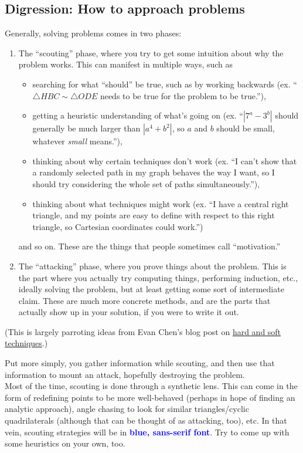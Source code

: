 \documentclass{scrartcl}
\providecommand{\ii}{\item}
\providecommand{\alert}[1]{{\sffamily\textbf{\textcolor{blue}{#1}}}}
\begin{document}
\subsection{Digression: How to approach problems}
Generally, solving problems comes in two phases:
\begin{enumerate}
	\ii The ``scouting'' phase, where you try to get some intuition
	about why the problem works.
	This can manifest in multiple ways, such as
	\begin{itemize}
		\ii searching for what ``should'' be true, such as by working backwards
		(ex. ``$\triangle HBC\sim\triangle ODE$ needs to be true
		for the problem to be true.''),
		\ii getting a heuristic understanding of what's going on
		(ex. ``$|7^a - 3^b|$ should generally be much larger than $|a^4 + b^2|$,
		so $a$ and $b$ should be small, whatever \emph{small} means.''),
		\ii thinking about why certain techniques don't work
		(ex. ``I can't show that a randomly selected path in my graph
		behaves the way I want, so I should try considering
		the whole set of paths simultaneously.''),
		\ii thinking about what techniques might work
		(ex. ``I have a central right triangle, and my points are easy to define
		with respect to this right triangle, so Cartesian coordinates could work.'')
	\end{itemize}
	and so on. These are the things that people sometimes call
	``motivation.''
	\ii The ``attacking'' phase, where you prove things about the problem.
	This is the part where you actually try computing things, performing induction,
	etc., ideally solving the problem, but at least getting some sort of
	intermediate claim. These are much more concrete methods,
	and are the parts that actually show up in your solution,
	if you were to write it out.
\end{enumerate}
(This is largely parroting ideas from Evan Chen's blog post on
\hyperlink{https://blog.evanchen.cc/2019/05/03/hard-and-soft-techniques/}{hard and soft techniques}.)

Put more simply, you gather information while scouting,
and then use that information to mount an attack, hopefully destroying the problem.\\

Most of the time, scouting is done through a synthetic lens.
This can come in the form of redefining points to be more well-behaved
(perhaps in hope of finding an analytic approach),
angle chasing to look for similar triangles/cyclic quadrilaterals
(although that can be thought of as attacking, too), etc.
In that vein, scouting strategies will be in \alert{blue, sans-serif font}.
Try to come up with some heuristics on your own, too.
\end{document}

